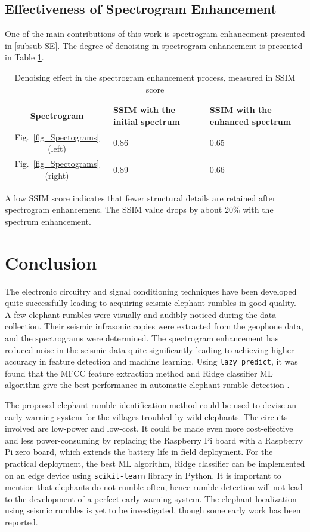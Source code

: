 \documentclass[applsci,article,accept,moreauthors,pdftex]{Definitions/mdpi}
\begin{document}
\subsection{Effectiveness of Spectrogram Enhancement}
One of the main contributions of this work is spectrogram enhancement presented in \ref{subsub-SE}. The degree of denoising in spectrogram enhancement is presented in Table \ref{tab_denoise}. 
\begin{table}[h]
	\centering
	\begin{tabular}{|c|p{3cm}|p{3cm}|}
		\hline
		\textbf{Spectrogram} & \textbf{SSIM with the initial spectrum ~\cite{zeppelzauer2015towards}} & \textbf{SSIM with the enhanced spectrum} \\
		\hline
		Fig.~\ref{fig_Spectograms}(left) & 0.86 &0.65\\
		\hline
		Fig.~\ref{fig_Spectograms}(right)& 0.89 & 0.66 \\
		\hline
	\end{tabular}
	\caption{Denoising effect in the spectrogram enhancement process, measured in SSIM score}
	\label{tab_denoise}
\end{table}
A low SSIM score indicates that fewer structural details are retained after spectrogram enhancement. The SSIM value drops by about 20\% with the spectrum enhancement.
\section{Conclusion}
The electronic circuitry and signal conditioning techniques have been developed quite successfully leading to acquiring seismic elephant rumbles in good quality. A few elephant rumbles were visually and audibly noticed during the data collection. Their seismic infrasonic copies were extracted from the geophone data, and the spectrograms were determined. The spectrogram enhancement has reduced noise in the seismic data quite significantly leading to achieving higher accuracy in feature detection and machine learning. Using {\tt lazy predict}, it was found that the MFCC feature extraction method and Ridge classifier ML algorithm give the best performance in automatic elephant rumble detection
.\par
The proposed elephant rumble identification method could be used to devise an early warning system for the villages troubled by wild elephants. The circuits involved are low-power and low-cost. It could be made even more cost-effective and less power-consuming by replacing the Raspberry Pi board with a Raspberry Pi zero board, which extends the battery life in field deployment. For the practical deployment, the best ML algorithm, Ridge classifier can be implemented on an edge device using {\tt scikit-learn} library in Python. It is important to mention that elephants do not rumble often, hence rumble detection will not lead to the development of a perfect early warning system. The elephant localization using seismic rumbles is yet to be investigated, though some early work has been reported.
		
\end{document}
